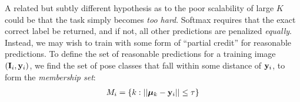 \documentclass[letterpaper]{article} %
\newcommand{\ie}{\textit{i.e.}}
\begin{document}
A related but subtly different hypothesis as to the poor scalability of large $K$ could be that the task simply becomes {\em too hard}.
Softmax requires that the exact correct label be returned, and if not, all other predictions are penalized {\em equally}. Instead, we may wish to train with some form of ``partial credit'' for reasonable predictions. To define the set of reasonable predictions for a training image $({\bf I}_i,{\bf y}_i)$, we find the set of pose classes that fall within some distance of ${\bf y}_i$, to form the {\em membership set}:
\begin{align}
    M_i = \{k: ||{\bm \mu}_k - {\bf y}_i|| \leq \tau\} \label{eq:members}
\end{align}
\end{document}
